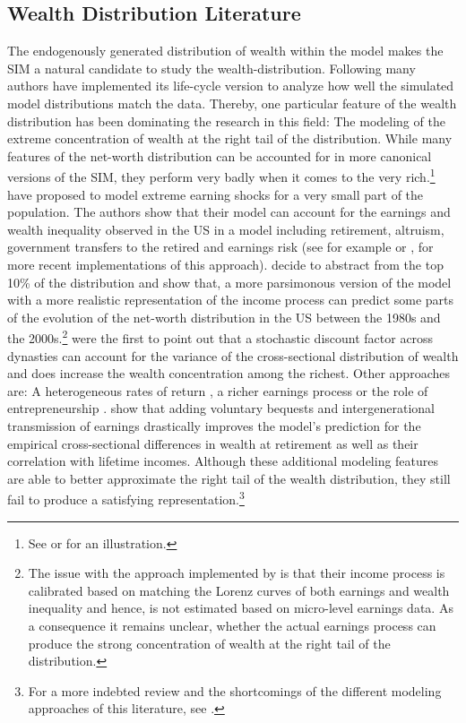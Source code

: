 \documentclass[a4paper,12pt,legno]{article}
\begin{document}
\subsection{Wealth Distribution Literature}
The endogenously generated distribution of wealth within the model makes the SIM a natural candidate to study the wealth-distribution.
Following \cite{huggett1996wealth} many authors have implemented its life-cycle version to analyze how well the simulated model distributions match the data. Thereby, one particular feature of the wealth distribution has been dominating the research in this field: The modeling of the extreme concentration of wealth at the right tail of the distribution. While many features of the net-worth distribution can be accounted for in more canonical versions of the SIM, they perform very badly when it comes to the very rich.\footnote{See \cite{huggett1996wealth} or \cite{quadrini1997understanding} for an illustration.} \\
\cite{castaneda2003} have proposed to model extreme earning shocks for a very small part of the population. The authors show that their model can account for the earnings and wealth inequality observed in the US in a model including retirement, altruism, government transfers to the retired and earnings risk (see for example \cite{diaz2010} or \cite{kaymak2016evolution}, for more recent implementations of this approach). \cite{hintermaier2011} decide to abstract from the top 10\% of the distribution and show that, a more parsimonous version of the model with a more realistic representation of the income process can predict some parts of the evolution of the net-worth distribution in the US between the 1980s and the 2000s.\footnote{The issue with the approach implemented by \citet{castaneda2003} is that their income process is calibrated based on matching the Lorenz curves of both earnings and wealth inequality and hence, is not estimated based on micro-level earnings data. As a consequence it remains unclear, whether the actual earnings process can produce the strong concentration of wealth at the right tail of the distribution.} \cite{krusell1998} were the first to point out that a stochastic discount factor across dynasties can account for the variance of the cross-sectional distribution of wealth and does increase the wealth concentration among the richest. Other approaches are: A heterogeneous rates of return \citep{benhabib2011distribution}, a richer earnings process \citep{denardi2016}  or the role of entrepreneurship \citep{cagetti2009}. \cite{denardi2014} show that adding voluntary bequests and intergenerational transmission of earnings drastically improves the model's prediction for the empirical cross-sectional differences in wealth at retirement as well as their correlation with lifetime incomes.  Although these additional modeling features are able to better approximate the right tail of the wealth distribution, they still fail to produce a satisfying representation.\footnote{For a more indebted review and the shortcomings of the different modeling approaches of this literature, see \cite{denardi2017}.}  \\
\end{document}
